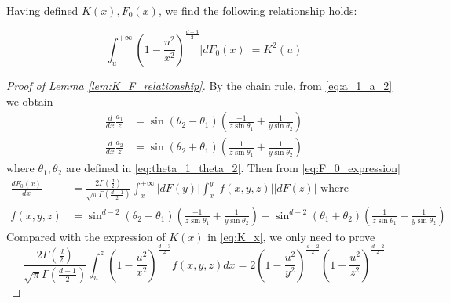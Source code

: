 \documentclass{aptpub}
\begin{document}
Having defined $K(x), F_0(x)$, we find the following relationship holds:
\begin{lemma}\label{lem:K_F_relationship}
\begin{equation}\label{eq:F_0_integration}
     \int_u^{+\infty}
     (1-\frac{u^2}{x^2})^{\frac{d-3}{2}} |dF_0(x)| = K^2(u)
\end{equation}
\end{lemma}
\begin{proof}[Proof of Lemma \ref{lem:K_F_relationship}]
     By the chain rule, from \eqref{eq:a_1_a_2} we obtain
\begin{align*}
    \frac{d}{dx}\frac{a_1}{z} &
    = \sin(\theta_2 - \theta_1)
    \left(\frac{-1}{z\sin\theta_1}
    +\frac{1}{y\sin \theta_2}\right)\\
    \frac{d}{dx}\frac{a_2}{z} &
    = \sin(\theta_2 + \theta_1)
    \left(\frac{1}{z\sin\theta_1}
    +\frac{1}{y\sin \theta_2}\right)
\end{align*}
where $\theta_1, \theta_2$ are defined in \eqref{eq:theta_1_theta_2}.
Then from \eqref{eq:F_0_expression}
\begin{align*}
    \frac{d F_0(x)}{dx} & =\frac{2\Gamma(\frac{d}{2})}
    {\sqrt{\pi}\Gamma(\frac{d-1}{2})}
    \int_x^{+\infty} |dF(y)| \int_x^y |f(x,y,z)| |dF(z)| 
    \textrm{ where }\\
    f(x,y,z) & = \sin^{d-2} (\theta_2 - \theta_1)
    \left(\frac{-1}{z\sin\theta_1}
    +\frac{1}{y\sin \theta_2}\right)
    - \sin^{d-2}(\theta_1 + \theta_2)
    \left(\frac{1}{z\sin\theta_1}
    +\frac{1}{y\sin \theta_2}\right)
\end{align*}
Compared with the expression of $K(x)$ in
\eqref{eq:K_x},
we only need to prove
\begin{equation}\label{eq:ref_prove_integration}    
    \frac{2\Gamma(\frac{d}{2})}
    {\sqrt{\pi}\Gamma(\frac{d-1}{2})}
    \int_u^z (1-\frac{u^2}{x^2})^{\frac{d-3}{2}}
    f(x,y,z)dx =
    2(1-\frac{u^2}{y^2})^{\frac{d-2}{2}}
    (1-\frac{u^2}{z^2})^{\frac{d-2}{2}}
\end{equation}
\end{proof}

\end{document}
